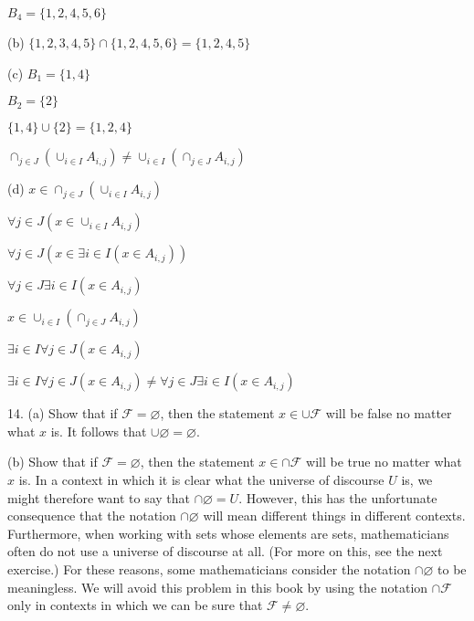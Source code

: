 \documentclass{article}
\begin{document}
$B_4 = \{1,2,4,5,6\}$

\vspace{20pt}

(b) $\{1, 2, 3, 4, 5\} \cap \{1,2,4,5,6\} = \{1,2,4,5\}$

\vspace{20pt}

(c) $B_1 = \{1,4\}$

$B_2 = \{2\}$

$\{1, 4\} \cup \{2\} = \{1, 2, 4\}$

$\cap_{j \in J} (\cup_{i \in I} A_{i,j}) \neq \cup_{i \in I} (\cap_{j \in J} A_{i,j})$

\vspace{20pt}

(d) $x \in \cap_{j \in J} (\cup_{i \in I} A_{i,j})$

$\forall j \in J (x \in \cup_{i \in I} A_{i,j})$

$\forall j \in J (x \in \exists i \in I (x \in A_{i, j}))$

$\forall j \in J \exists i \in I (x \in A_{i, j})$

\vspace{10pt}

$x \in \cup_{i \in I} (\cap_{j \in J} A_{i,j})$

$\exists i \in I \forall j \in J (x \in A_{i, j})$

\vspace{10pt}

$\exists i \in I \forall j \in J (x \in A_{i, j}) \neq \forall j \in J \exists i \in I (x \in A_{i, j})$

\vspace{30pt}

14. (a) Show that if $\mathcal{F} = \varnothing$, then the statement $x \in \cup \mathcal{F}$ will be false no
matter what $x$ is. It follows that $\cup \varnothing = \varnothing$.

\hspace{12pt}(b) Show that if $\mathcal{F} = \varnothing$, then the statement $x \in \cap \mathcal{F}$ will be true no
matter what $x$ is. In a context in which it is clear what the universe
of discourse $U$ is, we might therefore want to say that $\cap \varnothing = U$.
However, this has the unfortunate consequence that the notation $\cap \varnothing$
will mean different things in different contexts. Furthermore, when
working with sets whose elements are sets, mathematicians often
do not use a universe of discourse at all. (For more on this, see the
next exercise.) For these reasons, some mathematicians consider the
notation $\cap \varnothing$ to be meaningless. We will avoid this problem in this
book by using the notation $\cap \mathcal{F}$ only in contexts in which we can be
sure that $\mathcal{F} \neq \varnothing$.
\vspace{30pt}
\end{document}
